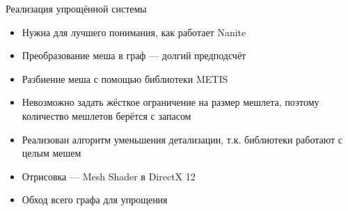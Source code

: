 \begin{frame}{Реализация упрощённой системы}
    \begin{itemize}
        \item Нужна для лучшего понимания, как работает Nanite
        \item Преобразование меша в граф --- долгий предподсчёт
        \item Разбиение меша с помощью библиотеки METIS
        \item Невозможно задать жёсткое ограничение на размер мешлета, поэтому количество мешлетов берётся с запасом
        \item Реализован алгоритм уменьшения детализации, т.к. библиотеки работают с целым мешем
        \item Отрисовка --- Mesh Shader в DirectX 12
        \item Обход всего графа для упрощения
    \end{itemize}
\end{frame}

